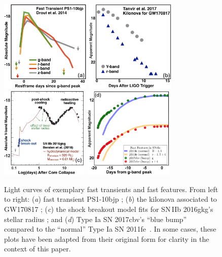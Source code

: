\documentclass[letterpaper,longauthor,trackchanges,twocolumn,onecolappendix,sort&compress]{aastex62}
\begin{document}
\begin{center}
\begin{figure}[!t]
\includegraphics[height=4.4cm]{figures/fasttrans2.png}
\includegraphics[height=4.4cm]{figures/Tanvir_fig2_remake_small.png}
\includegraphics[height=4.4cm]{figures/2016gkg2_small.png}
\includegraphics[height=4.4cm]{figures/bluebump2.png}
\caption{{Light curves of  exemplary fast transients and fast features. From left to right: (\emph{a}) fast transient PS1-10bjp \citep{Drout2014}; (\emph{b}) the kilonova associated to GW170817 \citep{Tanvir2017}; (\emph{c}) the shock breakout model fits for SN\,IIb 2016gkg's stellar radius \citep{Bersten2018}; and (\emph{d})  Type Ia SN 2017cbv's ``blue bump'' compared to the ``normal'' Type Ia SN 2011fe~\citep{Graham2015, Hosseinzadeh2017}.} In some cases, these plots have been adapted from their original form for clarity in the context of this paper.}\label{fig:examples}
\end{figure}
\end{center}
\end{document}
